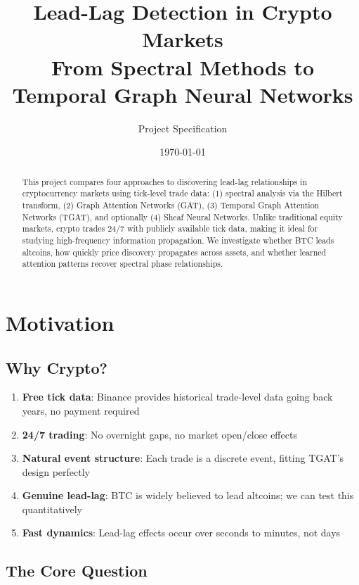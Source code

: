 \documentclass[11pt, a4paper]{article}
\title{\textbf{Lead-Lag Detection in Crypto Markets}\\[0.5em]\large From Spectral Methods to Temporal Graph Neural Networks}
\author{Project Specification}
\date{\today}
\begin{document}
\maketitle

\begin{abstract}
This project compares four approaches to discovering lead-lag relationships in cryptocurrency markets using tick-level trade data: (1) spectral analysis via the Hilbert transform, (2) Graph Attention Networks (GAT), (3) Temporal Graph Attention Networks (TGAT), and optionally (4) Sheaf Neural Networks. Unlike traditional equity markets, crypto trades 24/7 with publicly available tick data, making it ideal for studying high-frequency information propagation. We investigate whether BTC leads altcoins, how quickly price discovery propagates across assets, and whether learned attention patterns recover spectral phase relationships.
\end{abstract}

\tableofcontents
\newpage

\section{Motivation}

\subsection{Why Crypto?}

\begin{enumerate}
    \item \textbf{Free tick data}: Binance provides historical trade-level data going back years, no payment required
    \item \textbf{24/7 trading}: No overnight gaps, no market open/close effects
    \item \textbf{Natural event structure}: Each trade is a discrete event, fitting TGAT's design perfectly
    \item \textbf{Genuine lead-lag}: BTC is widely believed to lead altcoins; we can test this quantitatively
    \item \textbf{Fast dynamics}: Lead-lag effects occur over seconds to minutes, not days
\end{enumerate}

\subsection{The Core Question}
\end{document}
